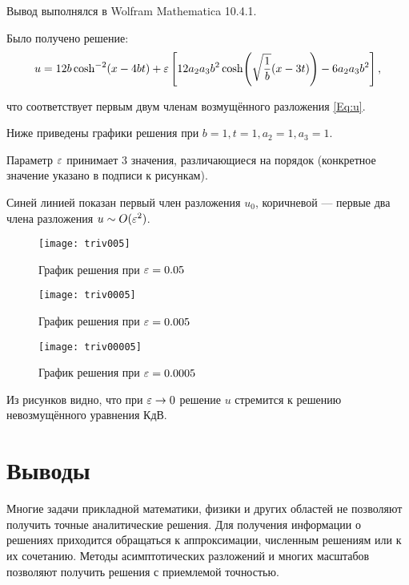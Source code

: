 Вывод выполнялся в Wolfram Mathematica 10.4.1.

Было получено решение:
\begin{equation*}
    u = 12 b \cosh^{-2}(x - 4 b t) +
    \varepsilon \left[ 12 a_2 a_3 b^2 \cosh(\sqrt{\frac{1}{b}} (x - 3 t)) -
    6 a_2 a_3 b^2 \right],
\end{equation*}

что соответствует первым двум членам возмущённого разложения \eqref{Eq:u}.

Ниже приведены графики решения
при $b = 1, t = 1, a_2 = 1, a_3 = 1$.

Параметр $\varepsilon$ принимает 3 значения,
различающиеся на порядок (конкретное значение указано в подписи к рисункам).

Синей линией показан первый член разложения $u_0$,
коричневой --- первые два члена разложения $u \sim O(\varepsilon^2)$.

\begin{figure}[H]
    \centering
    \texttt{[image: triv005]}
    \caption{График решения при $\varepsilon = 0.05$}
\end{figure}
\begin{figure}[H]
    \centering
    \texttt{[image: triv0005]}
    \caption{График решения при $\varepsilon = 0.005$}
\end{figure}
\begin{figure}[H]
    \centering
    \texttt{[image: triv00005]}
    \caption{График решения при $\varepsilon = 0.0005$}
\end{figure}

Из рисунков видно, что при $\varepsilon \to 0$
решение $u$ стремится к решению невозмущённого уравнения КдВ.

\section*{Выводы}

Многие задачи прикладной математики, физики
и других областей не позволяют получить точные аналитические решения.
Для получения информации о решениях приходится обращаться к аппроксимации,
численным решениям или к их сочетанию.
Методы асимптотических разложений и
многих масштабов позволяют получить решения с приемлемой точностью.

